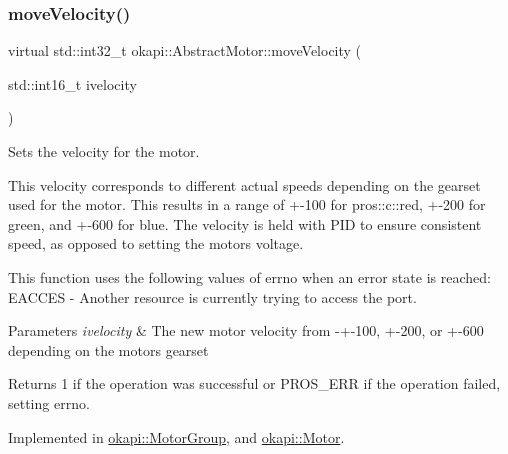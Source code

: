 \mbox{\label{classokapi_1_1AbstractMotor_a3170268f8d06f728327dcda08505e02b}} 
\subsubsection{\texorpdfstring{moveVelocity()}{moveVelocity()}}
{\footnotesize\ttfamily virtual std\+::int32\+\_\+t okapi\+::\+Abstract\+Motor\+::move\+Velocity (\begin{DoxyParamCaption}\item[{std\+::int16\+\_\+t}]{ivelocity }\end{DoxyParamCaption})\hspace{0.3cm}{\ttfamily [pure virtual]}}

Sets the velocity for the motor.

This velocity corresponds to different actual speeds depending on the gearset used for the motor. This results in a range of +-\/100 for pros\+::c\+::red, +-\/200 for green, and +-\/600 for blue. The velocity is held with P\+ID to ensure consistent speed, as opposed to setting the motor\textquotesingle{}s voltage.

This function uses the following values of errno when an error state is reached\+: E\+A\+C\+C\+ES -\/ Another resource is currently trying to access the port.


\begin{DoxyParams}{Parameters}
{\em ivelocity} & The new motor velocity from -\/+-\/100, +-\/200, or +-\/600 depending on the motor\textquotesingle{}s gearset \\
\hline
\end{DoxyParams}
\begin{DoxyReturn}{Returns}
1 if the operation was successful or P\+R\+O\+S\+\_\+\+E\+RR if the operation failed, setting errno. 
\end{DoxyReturn}


Implemented in \mbox{\hyperlink{classokapi_1_1MotorGroup_a9f31c14e92efe7ab492b2c335c51b488}{okapi\+::\+Motor\+Group}}, and \mbox{\hyperlink{classokapi_1_1Motor_afc3377b9b10a72de0c22e9a74cbcfd16}{okapi\+::\+Motor}}.

\mbox{\label{classokapi_1_1AbstractMotor_a15d12555f527109b046c65fe753d7e20}} 
